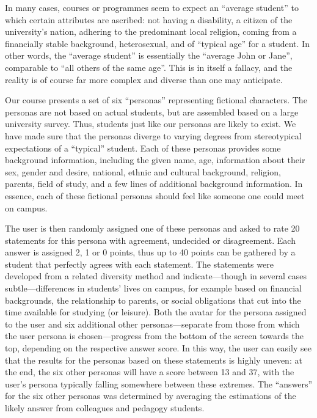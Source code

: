 \documentclass[sigconf,screen]{acmart}
\begin{document}
In many cases, courses or programmes seem to expect an ``average student'' to which
certain attributes are ascribed: not having  a disability, a citizen of the university's nation,
adhering to the predominant local religion, coming from a financially stable background,
heterosexual, and of ``typical age'' for a student. In other words, the ``average student''
is essentially the ``average John or Jane'', comparable to ``all others of the same age''.
This is in itself a fallacy, and the reality is of course far more complex and diverse than
one may anticipate.

Our course presents a set of six ``personas'' representing fictional characters. The
personas are not based on actual students, but are assembled based on a large
university survey. Thus, students just like our personas are likely to exist.
We have made sure that the personas diverge to varying degrees from stereotypical expectations
of a ``typical'' student. Each of these personas provides some background information, including the
given name, age, information about their sex, gender and desire, national, ethnic and
cultural background, religion, parents, field of study, and a few lines of additional
background information. In essence, each of these fictional personas
should feel like someone one could meet on campus.

The user is then randomly assigned one of these personas and asked to rate 20
statements for this persona with agreement, undecided or disagreement. Each answer
is assigned 2, 1 or 0 points, thus up to 40 points can be gathered by a student
that perfectly agrees with each statement. The statements were developed from a
related diversity method and indicate---though in several cases subtle---differences
in students' lives on campus, for example based on financial backgrounds, the relationship
to parents, or social obligations that cut into the time available for studying
(or leisure). Both the avatar for the persona assigned to the user  and six additional
other personas---separate from those from which the user persona is chosen---progress
from the bottom of the screen towards the top, depending on the respective answer
score. In this way, the user can easily see that the results for the personas based
on these statements is highly uneven: at the end, the six other personas will have a
score between 13 and 37, with the user's persona typically falling
somewhere between these extremes. The ``answers'' for the six other personas was determined by
averaging the estimations of the likely answer from colleagues and pedagogy students. 
\end{document}
